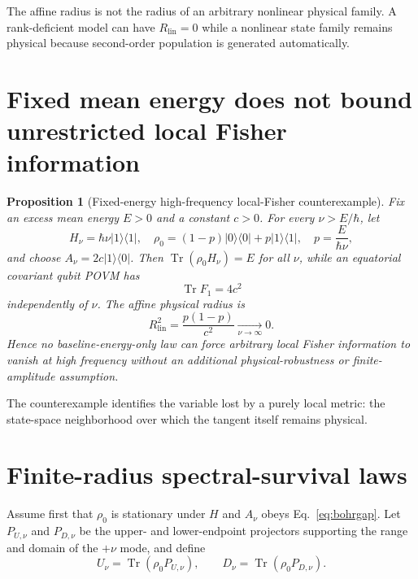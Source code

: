 \documentclass[aps,pra,preprint,nofootinbib]{revtex4-2}
\newtheorem{proposition}{Proposition}
\newcommand{\Tr}{\operatorname{Tr}}
\newcommand{\Rlin}{R_{\mathrm{lin}}}
\newcommand{\rhozero}{\rho_0}
\newcommand{\Fcl}{F}
\begin{document}
The affine radius is not the radius of an arbitrary nonlinear physical family. A rank-deficient model can have $\Rlin=0$ while a nonlinear state family remains physical because second-order population is generated automatically.

\section{Fixed mean energy does not bound unrestricted local Fisher information}
\label{sec:nogo}

\begin{proposition}[Fixed-energy high-frequency local-Fisher counterexample]
\label{prop:nogo}
Fix an excess mean energy $E>0$ and a constant $c>0$. For every $\nu>E/\hbar$, let
\begin{equation}
H_\nu=\hbar\nu |1\rangle\!\langle1|,
\quad
\rhozero=(1-p)|0\rangle\!\langle0|+p|1\rangle\!\langle1|,
\quad
p=\frac{E}{\hbar\nu},
\end{equation}
and choose $A_\nu=2c|1\rangle\!\langle0|$. Then $\Tr(\rhozero H_\nu)=E$ for all $\nu$, while an equatorial covariant qubit POVM has
\begin{equation}
\Tr \Fcl_1=4c^2
\end{equation}
independently of $\nu$. The affine physical radius is
\begin{equation}
\Rlin^2=\frac{p(1-p)}{c^2}\xrightarrow[\nu\to\infty]{}0.
\end{equation}
Hence no baseline-energy-only law can force arbitrary local Fisher information to vanish at high frequency without an additional physical-robustness or finite-amplitude assumption.
\end{proposition}

The counterexample identifies the variable lost by a purely local metric: the state-space neighborhood over which the tangent itself remains physical.

\section{Finite-radius spectral-survival laws}
\label{sec:finite-radius}

Assume first that $\rhozero$ is stationary under $H$ and $A_\nu$ obeys Eq.~\eqref{eq:bohrgap}. Let $P_{U,\nu}$ and $P_{D,\nu}$ be the upper- and lower-endpoint projectors supporting the range and domain of the $+\nu$ mode, and define
\begin{equation}
U_\nu=\Tr(\rhozero P_{U,\nu}),\qquad
D_\nu=\Tr(\rhozero P_{D,\nu}).
\end{equation}
\end{document}
